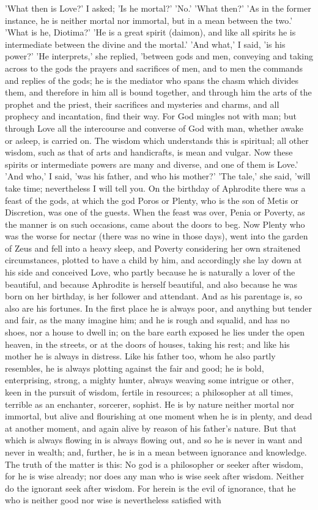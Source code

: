\para[115] 'What then is Love?' I asked; 'Is he mortal?' 'No.' 'What then?' 'As in the former instance, he is neither mortal nor immortal, but in a mean between the two.' 'What is he, Diotima?' 'He is a great spirit (daimon), and like all spirits he is intermediate between the divine and the mortal.' 'And what,' I said, 'is his power?' 'He interprets,' she replied, 'between gods and men, conveying and taking across to the gods the prayers and sacrifices of men, and to men the commands and replies of the gods; he is the mediator who spans the chasm which divides them, and therefore in him all is bound together, and through him the arts of the prophet and the priest, their sacrifices and mysteries and charms, and all prophecy and incantation, find their way. For God mingles not with man; but through Love all the intercourse and converse of God with man, whether awake or asleep, is carried on. The wisdom which understands this is spiritual; all other wisdom, such as that of arts and handicrafts, is mean and vulgar. Now these spirits or intermediate powers are many and diverse, and one of them is Love.' 'And who,' I said, 'was his father, and who his mother?' 'The tale,' she said, 'will take time; nevertheless I will tell you. On the birthday of Aphrodite there was a feast of the gods, at which the god Poros or Plenty, who is the son of Metis or Discretion, was one of the guests. When the feast was over, Penia or Poverty, as the manner is on such occasions, came about the doors to beg. Now Plenty who was the worse for nectar (there was no wine in those days), went into the garden of Zeus and fell into a heavy sleep, and Poverty considering her own straitened circumstances, plotted to have a child by him, and accordingly she lay down at his side and conceived Love, who partly because he is naturally a lover of the beautiful, and because Aphrodite is herself beautiful, and also because he was born on her birthday, is her follower and attendant. And as his parentage is, so also are his fortunes. In the first place he is always poor, and anything but tender and fair, as the many imagine him; and he is rough and squalid, and has no shoes, nor a house to dwell in; on the bare earth exposed he lies under the open heaven, in the streets, or at the doors of houses, taking his rest; and like his mother he is always in distress. Like his father too, whom he also partly resembles, he is always plotting against the fair and good; he is bold, enterprising, strong, a mighty hunter, always weaving some intrigue or other, keen in the pursuit of wisdom, fertile in resources; a philosopher at all times, terrible as an enchanter, sorcerer, sophist. He is by nature neither mortal nor immortal, but alive and flourishing at one moment when he is in plenty, and dead at another moment, and again alive by reason of his father's nature. But that which is always flowing in is always flowing out, and so he is never in want and never in wealth; and, further, he is in a mean between ignorance and knowledge. The truth of the matter is this: No god is a philosopher or seeker after wisdom, for he is wise already; nor does any man who is wise seek after wisdom. Neither do the ignorant seek after wisdom. For herein is the evil of ignorance, that he who is neither good nor wise is nevertheless satisfied with 